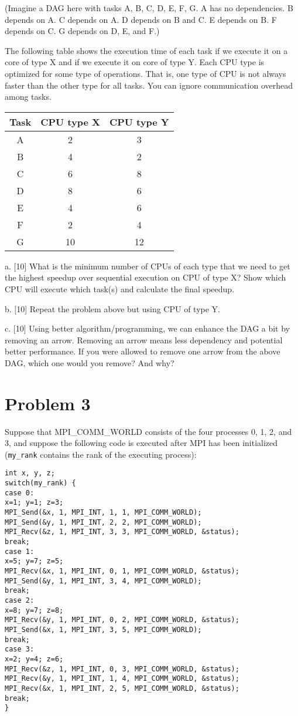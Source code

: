 \documentclass{article}
\begin{document}
(Imagine a DAG here with tasks A, B, C, D, E, F, G.  A has no dependencies. B depends on A. C depends on A. D depends on B and C. E depends on B. F depends on C. G depends on D, E, and F.)


The following table shows the execution time of each task if we execute it on a core of type X and if we execute it on core of type Y. Each CPU type is optimized for some type of operations. That is, one type of CPU is not always faster than the other type for all tasks. You can ignore communication overhead among tasks.

\begin{tabular}{|c|c|c|}
\hline
Task & CPU type X & CPU type Y \\
\hline
A & 2 & 3 \\
B & 4 & 2 \\
C & 6 & 8 \\
D & 8 & 6 \\
E & 4 & 6 \\
F & 2 & 4 \\
G & 10 & 12 \\
\hline
\end{tabular}

a. [10] What is the minimum number of CPUs of each type that we need to get the highest speedup over sequential execution on CPU of type X? Show which CPU will execute which task(s) and calculate the final speedup.

b. [10] Repeat the problem above but using CPU of type Y.

c. [10] Using better algorithm/programming, we can enhance the DAG a bit by removing an arrow. Removing an arrow means less dependency and potential better performance. If you were allowed to remove one arrow from the above DAG, which one would you remove? And why?


\section*{Problem 3}
Suppose that MPI\_COMM\_WORLD consists of the four processes 0, 1, 2, and 3, and suppose the following code is executed after MPI has been initialized (\texttt{my\_rank} contains the rank of the executing process):

\begin{verbatim}
int x, y, z;
switch(my_rank) {
case 0:
x=1; y=1; z=3;
MPI_Send(&x, 1, MPI_INT, 1, 1, MPI_COMM_WORLD);
MPI_Send(&y, 1, MPI_INT, 2, 2, MPI_COMM_WORLD);
MPI_Recv(&z, 1, MPI_INT, 3, 3, MPI_COMM_WORLD, &status);
break;
case 1:
x=5; y=7; z=5;
MPI_Recv(&x, 1, MPI_INT, 0, 1, MPI_COMM_WORLD, &status);
MPI_Send(&y, 1, MPI_INT, 3, 4, MPI_COMM_WORLD);
break;
case 2:
x=8; y=7; z=8;
MPI_Recv(&y, 1, MPI_INT, 0, 2, MPI_COMM_WORLD, &status);
MPI_Send(&x, 1, MPI_INT, 3, 5, MPI_COMM_WORLD);
break;
case 3:
x=2; y=4; z=6;
MPI_Recv(&z, 1, MPI_INT, 0, 3, MPI_COMM_WORLD, &status);
MPI_Recv(&y, 1, MPI_INT, 1, 4, MPI_COMM_WORLD, &status);
MPI_Recv(&x, 1, MPI_INT, 2, 5, MPI_COMM_WORLD, &status);
break;
}
\end{verbatim}
\end{document}
